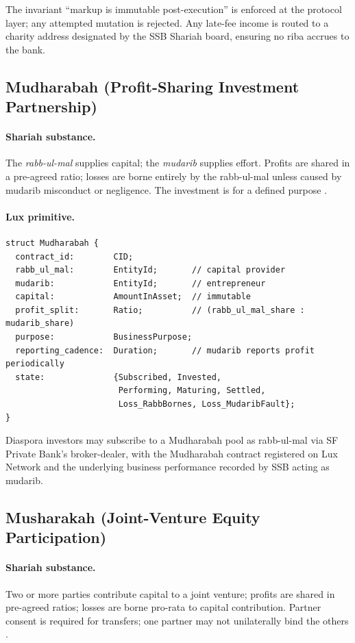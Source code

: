 \documentclass[11pt,letterpaper]{article}
\begin{document}
The invariant ``markup is immutable post-execution'' is enforced at
the protocol layer; any attempted mutation is rejected. Any late-fee
income is routed to a charity address designated by the SSB Shariah
board, ensuring no riba accrues to the bank.

\subsection{Mudharabah (Profit-Sharing Investment Partnership)}

\paragraph{Shariah substance.} The \emph{rabb-ul-mal} supplies capital;
the \emph{mudarib} supplies effort. Profits are shared in a pre-agreed
ratio; losses are borne entirely by the rabb-ul-mal unless caused by
mudarib misconduct or negligence. The investment is for a defined
purpose \cite{aaoifi_standards}.

\paragraph{Lux primitive.}
\begin{verbatim}
struct Mudharabah {
  contract_id:        CID;
  rabb_ul_mal:        EntityId;       // capital provider
  mudarib:            EntityId;       // entrepreneur
  capital:            AmountInAsset;  // immutable
  profit_split:       Ratio;          // (rabb_ul_mal_share : mudarib_share)
  purpose:            BusinessPurpose;
  reporting_cadence:  Duration;       // mudarib reports profit periodically
  state:              {Subscribed, Invested,
                       Performing, Maturing, Settled,
                       Loss_RabbBornes, Loss_MudaribFault};
}
\end{verbatim}

Diaspora investors may subscribe to a Mudharabah pool as rabb-ul-mal
via SF Private Bank's broker-dealer, with the Mudharabah contract
registered on Lux Network and the underlying business performance
recorded by SSB acting as mudarib.

\subsection{Musharakah (Joint-Venture Equity Participation)}

\paragraph{Shariah substance.} Two or more parties contribute capital
to a joint venture; profits are shared in pre-agreed ratios; losses
are borne pro-rata to capital contribution. Partner consent is required
for transfers; one partner may not unilaterally bind the others
\cite{aaoifi_standards}.
\end{document}
